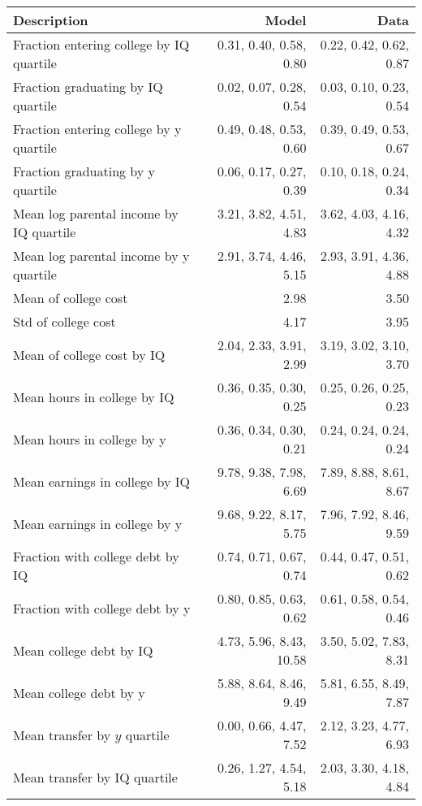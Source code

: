 \begin{tabular}{lrr}
\hline
Description & Model  & Data  \\
\hline
Fraction entering college by IQ quartile & 0.31, 0.40, 0.58, 0.80  & 0.22, 0.42, 0.62, 0.87  \\
Fraction graduating by IQ quartile & 0.02, 0.07, 0.28, 0.54  & 0.03, 0.10, 0.23, 0.54  \\
Fraction entering college by y quartile & 0.49, 0.48, 0.53, 0.60  & 0.39, 0.49, 0.53, 0.67  \\
Fraction graduating by y quartile & 0.06, 0.17, 0.27, 0.39  & 0.10, 0.18, 0.24, 0.34  \\
Mean log parental income by IQ quartile & 3.21, 3.82, 4.51, 4.83  & 3.62, 4.03, 4.16, 4.32  \\
Mean log parental income by y quartile & 2.91, 3.74, 4.46, 5.15  & 2.93, 3.91, 4.36, 4.88  \\
Mean of college cost & 2.98  & 3.50  \\
Std of college cost & 4.17  & 3.95  \\
Mean of college cost by IQ & 2.04, 2.33, 3.91, 2.99  & 3.19, 3.02, 3.10, 3.70  \\
Mean hours in college by IQ & 0.36, 0.35, 0.30, 0.25  & 0.25, 0.26, 0.25, 0.23  \\
Mean hours in college by y & 0.36, 0.34, 0.30, 0.21  & 0.24, 0.24, 0.24, 0.24  \\
Mean earnings in college by IQ & 9.78, 9.38, 7.98, 6.69  & 7.89, 8.88, 8.61, 8.67  \\
Mean earnings in college by y & 9.68, 9.22, 8.17, 5.75  & 7.96, 7.92, 8.46, 9.59  \\
Fraction with college debt by IQ & 0.74, 0.71, 0.67, 0.74  & 0.44, 0.47, 0.51, 0.62  \\
Fraction with college debt by y & 0.80, 0.85, 0.63, 0.62  & 0.61, 0.58, 0.54, 0.46  \\
Mean college debt by IQ & 4.73, 5.96, 8.43, 10.58  & 3.50, 5.02, 7.83, 8.31  \\
Mean college debt by y & 5.88, 8.64, 8.46, 9.49  & 5.81, 6.55, 8.49, 7.87  \\
Mean transfer by $y$ quartile & 0.00, 0.66, 4.47, 7.52  & 2.12, 3.23, 4.77, 6.93  \\
Mean transfer by IQ quartile & 0.26, 1.27, 4.54, 5.18  & 2.03, 3.30, 4.18, 4.84  \\
\hline
\end{tabular}%
